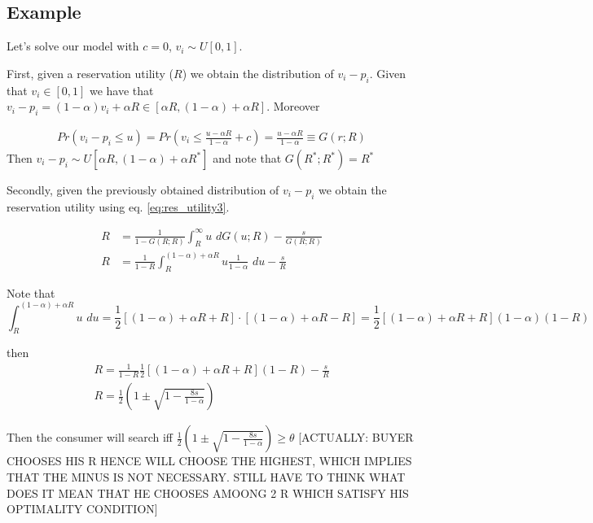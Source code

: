\documentclass[12pt]{article}
\theoremstyle{plain}
\theoremstyle{plain}
\begin{document}
\subsection{Example}

Let's solve our model with $c = 0$, $v_i \sim U[0,1]$.

First, given a reservation utility ($ R$) we obtain the distribution of $v_i - p_i$. 
Given that $v_i \in [0,1]$ we have that $v_i - p_i = (1-\alpha) v_i + \alpha R\in [\alpha R,(1-\alpha)+ \alpha R]$. Moreover 

\begin{align}
    Pr(v_i-p_i\leq u) = Pr\left(v_i \leq \frac{u-\alpha R}{1-\alpha}+c\right)= \frac{u-\alpha R}{1-\alpha}\equiv G(r; R)
\end{align}
Then $v_i - p_i \sim U[\alpha R, (1-\alpha) + \alpha R^*]$ and note that $G(R^*; R^*) = R^*$

Secondly, given the previously obtained distribution of $v_i -p_i$ we obtain the reservation utility using eq. \ref{eq:res_utility3}. 


\begin{align*}
        R &= \frac{1}{1-G(R; R)} \int_R^\infty u \, \, dG(u; R) -\frac{s}{G(R; R)} \\
         R &= \frac{1}{1-R} \int_{R}^{ (1-\alpha) + \alpha R} u \frac{1}{1-\alpha}\, \, du -\frac{s}{R}
\end{align*}

Note that $$ \int_{R}^{ (1-\alpha) + \alpha R} u \, \, du =\frac{1}{2} [ (1-\alpha) + \alpha R +R]\cdot [ (1-\alpha) + \alpha R - R] =  \frac{1}{2}[ (1-\alpha) + \alpha R +R] (1-\alpha)(1-  R)$$

then 
\begin{align*}
        R = \frac{1}{1-R} \frac{1}{2} [ (1-\alpha) + \alpha R +R](1-  R) -\frac{s}{R} \\
        R = \frac{1}{2} \left( 1 \pm \sqrt{1 - \frac{8s}{1 - \alpha}} \right)
\end{align*}

Then the consumer will search iff $\frac{1}{2} \left( 1 \pm \sqrt{1 - \frac{8s}{1 - \alpha}} \right) \geq \theta$ [ACTUALLY: BUYER CHOOSES HIS R HENCE WILL CHOOSE THE HIGHEST, WHICH IMPLIES THAT THE MINUS IS NOT NECESSARY. STILL HAVE TO THINK WHAT DOES IT MEAN THAT HE CHOOSES AMOONG 2 R WHICH SATISFY HIS OPTIMALITY CONDITION]
\end{document}
